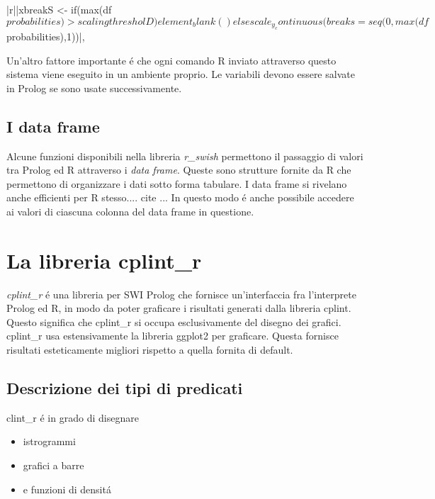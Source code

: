 \documentclass[10pt,titlepage,twoside,a4paper]{report}
\newenvironment{code}{\singlespacing\captionsetup{type=listing}}{}
\begin{document}
\begin{code}
    \caption{Esempio di quasi quotation tratto da cplint\_r}
    \begin{rcode*}{}
{|r||xbreakS <- if(max(df$probabilities) > scalingthresholD) element_blank() else scale_y_continuous(breaks=seq(0,max(df$probabilities),1))|},
    \end{rcode*}
\end{code}

Un'altro fattore importante \'e che ogni comando R inviato attraverso questo 
sistema viene eseguito in un ambiente proprio. Le variabili devono essere 
salvate in Prolog se sono usate successivamente.

\section{I data frame}
Alcune funzioni disponibili nella libreria \emph{r\_swish} permettono il 
passaggio di valori tra Prolog ed R attraverso i \emph{data frame}. Queste sono 
strutture fornite da R che permettono di organizzare i dati sotto forma 
tabulare. I data frame si rivelano anche efficienti per R stesso.... cite ... 
In questo modo \'e anche possibile accedere ai valori di ciascuna colonna del 
data frame in questione.




\chapter{La libreria cplint\_r} \label{la-libreria-cplint-r}
\emph{cplint\_r} \'e una libreria per SWI Prolog che fornisce un'interfaccia 
fra l'interprete Prolog ed R, in modo da poter graficare i risultati generati 
dalla libreria cplint. Questo significa che cplint\_r si occupa esclusivamente 
del disegno dei grafici. cplint\_r usa estensivamente la libreria ggplot2 per 
graficare. Questa fornisce risultati esteticamente migliori rispetto a quella 
fornita di default.

\section{Descrizione dei tipi di predicati}
clint\_r \'e in grado di disegnare
\begin{itemize}
    \item istrogrammi
    \item grafici a barre
    \item e funzioni di densit\'a
\end{itemize}
\end{document}

